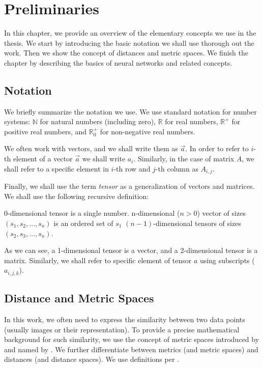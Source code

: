\chapter{Preliminaries}


In this chapter, we provide an overview of the elementary concepts we use in the thesis. We start by introducing the basic notation we shall
use thorough out the work. Then we show the concept of distances and
metric spaces. We finish the chapter by describing the basics of
neural networks and related concepts.

\section{Notation}

We briefly summarize the notation we use. We use standard notation for number systems: $\mathbb{N}$ for natural numbers (including zero), $\mathbb{R}$ for real numbers, $\mathbb{R}^+$ for positive real numbers, and $\mathbb{R}^+_0$ for non-negative real numbers.

We often work with vectors, and we shall write them as $\vec{a}$. In order to refer to $i$-th element of a vector $\vec{a}$ we shall write $a_i$. Similarly, in the case of matrix $A$, we shall refer to a specific element in $i$-th row and $j$-th column as $A_{i,j}$.

Finally, we shall use the term \emph{tensor} as a generalization of vectors and matrices. We shall use the following recursive definition:

\begin{defn}
0-dimensional tensor is a single number. n-dimensional ($n > 0$) vector of sizes
$(s_1, s_2, \ldots, s_n)$ is an ordered set of $s_1$ $(n-1)$-dimensional
tensors of sizes $(s_2, s_3, \ldots, s_n)$.
\end{defn}

As we can see, a 1-dimensional tensor is a vector, and a 2-dimensional tensor is a matrix. Similarly, we shall refer to specific element of tensor $a$ using subscripts ($a_{i,j,k}$).

\section{Distance and Metric Spaces}
\label{sec:distances}

In this work, we often need to express the similarity between two data points (usually images or their representation). To provide a precise mathematical background for such similarity, we use the concept of metric spaces introduced by \cite{metric} and named by \cite{metricname}. We further differentiate between metrics (and metric spaces) and distances (and distance spaces). We use definitions per \cite{deza2009encyclopedia}.


